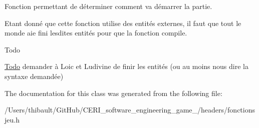 Fonction permettant de déterminer comment va démarrer la partie. 

Etant donné que cette fonction utilise des entités externes, il faut que tout le monde aie fini lesdites entités pour que la fonction compile.

\begin{DoxyRefDesc}{Todo}
\item[\hyperlink{todo__todo000001}{Todo}]demander à Loic et Ludivine de finir les entités (ou au moins nous dire la syntaxe demandée) \end{DoxyRefDesc}


The documentation for this class was generated from the following file\+:\begin{DoxyCompactItemize}
\item 
/\+Users/thibault/\+Git\+Hub/\+C\+E\+R\+I\+\_\+software\+\_\+engineering\+\_\+game\+\_/headers/fonctionsjeu.\+h\end{DoxyCompactItemize}
